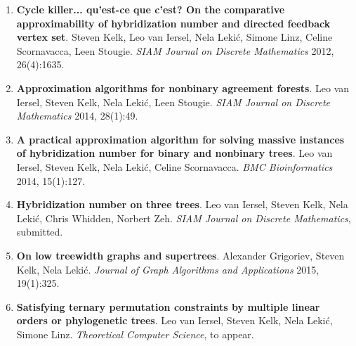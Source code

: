 \begin{enumerate}
 \item \textbf{Cycle killer... qu'est-ce que c'est? On the comparative approximability of hybridization number and directed feedback vertex set}. Steven Kelk, Leo van Iersel, Nela Leki\'c, Simone Linz, Celine Scornavacca, Leen Stougie. \textit{SIAM Journal on Discrete Mathematics} 2012, 26(4):1635.
 
 \item \textbf{Approximation algorithms for nonbinary agreement forests}. Leo van Iersel, Steven Kelk, Nela Leki\'c, Leen Stougie. \textit{SIAM Journal on Discrete Mathematics} 2014, 28(1):49.
 
 \item \textbf{A practical approximation algorithm for solving massive instances of hybridization number for binary and nonbinary trees}. Leo van Iersel, Steven Kelk, Nela Leki\'c, Celine Scornavacca. \textit{BMC Bioinformatics} 2014, 15(1):127.
 
 \item \textbf{Hybridization number on three trees}. Leo van Iersel, Steven Kelk, Nela Leki\'c, Chris Whidden, Norbert Zeh. \textit{SIAM Journal on Discrete Mathematics}, submitted.
 
 \item \textbf{On low treewidth graphs and supertrees}. Alexander Grigoriev, Steven Kelk, Nela Leki\'c. \textit{Journal of Graph Algorithms and Applications} 2015, 19(1):325.

 \item \textbf{Satisfying ternary permutation constraints by multiple linear orders or phylogenetic trees}. Leo van Iersel, Steven Kelk, Nela Leki\'c, Simone Linz. \textit{Theoretical Computer Science}, to appear.  
\end{enumerate}